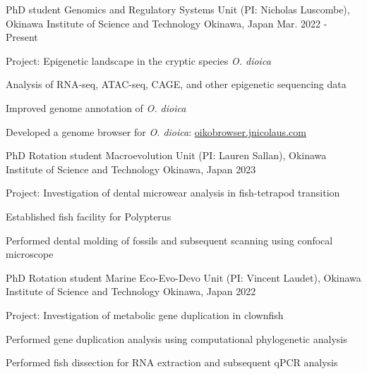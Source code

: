 

\begin{cventries}

  \cventry
    {PhD student} %
    {Genomics and Regulatory Systems Unit (PI: Nicholas Luscombe), Okinawa Institute of Science and Technology} %
    {Okinawa, Japan} %
    {Mar. 2022 - Present} %
    {
      \begin{cvitems} %
        \item {Project: Epigenetic landscape in the cryptic species \textit{O. dioica}}
        \item {Analysis of RNA-seq, ATAC-seq, CAGE, and other epigenetic sequencing data}
        \item {Improved genome annotation of \textit{O. dioica}}
        \item {Developed a genome browser for \textit{O. dioica}: \href{oikobrowser.jnicolaus.com}{oikobrowser.jnicolaus.com}}
      \end{cvitems}
    }

  \cventry
    {PhD Rotation student} %
    {Macroevolution Unit (PI: Lauren Sallan), Okinawa Institute of Science and Technology} %
    {Okinawa, Japan} %
    {2023} %
    {
      \begin{cvitems} %
        \item {Project: Investigation of dental microwear analysis in fish-tetrapod transition}
        \item {Established fish facility for Polypterus}
        \item {Performed dental molding of fossils and subsequent scanning using confocal microscope}
      \end{cvitems}
    }

  \cventry
    {PhD Rotation student} %
    {Marine Eco-Evo-Devo Unit (PI: Vincent Laudet), Okinawa Institute of Science and Technology} %
    {Okinawa, Japan} %
    {2022} %
    {
      \begin{cvitems} %
        \item {Project: Investigation of metabolic gene duplication in clownfish}
        \item {Performed gene duplication analysis using computational phylogenetic analysis}
        \item {Performed fish dissection for RNA extraction and subsequent qPCR analysis}
      \end{cvitems}
    }


\end{cventries}
